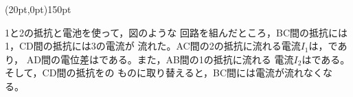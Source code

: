 \hakosyokika
\item
    \begin{mawarikomi}(20pt,0pt){150pt}{
        
    }
        1と2の抵抗と電池を使って，図のような
        回路を組んだところ，BC間の抵抗には1，CD間の抵抗には3の電流が
        流れた。AC間の2の抵抗に流れる電流$I_1$は，\Hako {}であり，
        AD間の電位差は\Hako {}である。また，AB間の1の抵抗に流れる
        電流$I_2$は\Hako {}である。そして，CD間の抵抗を\Hako {}の
        ものに取り替えると，BC間には電流が流れなくなる。
    \end{mawarikomi}